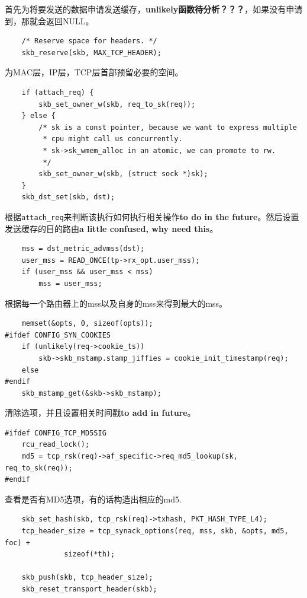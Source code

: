                 首先为将要发送的数据申请发送缓存，\textbf{unlikely函数待分析？？？}，如果没有申请到，那就会返回NULL。

\begin{verbatim}
	/* Reserve space for headers. */
	skb_reserve(skb, MAX_TCP_HEADER);
\end{verbatim}

				为MAC层，IP层，TCP层首部预留必要的空间。

\begin{verbatim}
	if (attach_req) {
		skb_set_owner_w(skb, req_to_sk(req));
	} else {
		/* sk is a const pointer, because we want to express multiple
		 * cpu might call us concurrently.
		 * sk->sk_wmem_alloc in an atomic, we can promote to rw.
		 */
		skb_set_owner_w(skb, (struct sock *)sk);
	}
	skb_dst_set(skb, dst);
\end{verbatim}

				根据\texttt{attach_req}来判断该执行如何执行相关操作\textbf{to do in the future}。然后设置发送缓存的目的路由\textbf{a little confused, why need this}。

\begin{verbatim}
	mss = dst_metric_advmss(dst);
	user_mss = READ_ONCE(tp->rx_opt.user_mss);
	if (user_mss && user_mss < mss)
		mss = user_mss;
\end{verbatim}

				根据每一个路由器上的mss以及自身的mss来得到最大的mss。
\begin{verbatim}
	memset(&opts, 0, sizeof(opts));
#ifdef CONFIG_SYN_COOKIES
	if (unlikely(req->cookie_ts))
		skb->skb_mstamp.stamp_jiffies = cookie_init_timestamp(req);
	else
#endif
	skb_mstamp_get(&skb->skb_mstamp);
\end{verbatim}

				清除选项，并且设置相关时间戳\textbf{to add in future}。


\begin{verbatim}
#ifdef CONFIG_TCP_MD5SIG
	rcu_read_lock();
	md5 = tcp_rsk(req)->af_specific->req_md5_lookup(sk, req_to_sk(req));
#endif
\end{verbatim}

				查看是否有MD5选项，有的话构造出相应的md5.

\begin{verbatim}
	skb_set_hash(skb, tcp_rsk(req)->txhash, PKT_HASH_TYPE_L4);
	tcp_header_size = tcp_synack_options(req, mss, skb, &opts, md5, foc) +
			  sizeof(*th);

	skb_push(skb, tcp_header_size);
	skb_reset_transport_header(skb);
\end{verbatim}

